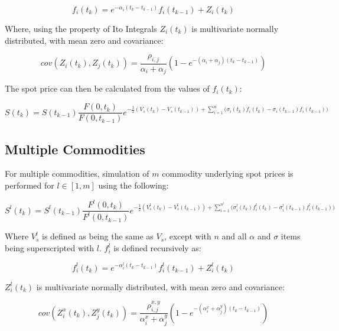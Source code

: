 \documentclass{article}
\begin{document}
\begin{equation}
    f_i(t_k) = e^{-\alpha_i(t_k - t_{k-1})}f_i(t_{k-1}) + Z_i(t_k)
\end{equation}

Where, using the property of Ito Integrals $Z_i(t_k)$ is multivariate normally 
distributed, with mean zero and covariance:

\begin{equation}
    cov(Z_i(t_k), Z_j(t_k)) = \frac{\rho_{i, j}}{\alpha_i + \alpha_j}(1 - 
    e^{-(\alpha_i + \alpha_j)(t_k - t_{k-1})})
\end{equation}

The spot price can then be calculated from the values of $f_i(t_k)$:

\begin{equation}
    S(t_k) = S(t_{k-1}) \frac{F(0, t_k)}{F(0, t_{k-1})} e^{- \frac{1}{2} (V_s(t_k) - 
    V_s(t_{k-1})) + \sum_{i=1}^n \bigl(\sigma_i(t_k)f_i(t_k) - \sigma_i(t_{k-1})f_i(t_{k-1})\bigr)}
\end{equation}

\subsection{Multiple Commodities}
For multiple commodities, simulation of $m$ commodity underlying spot prices is 
performed for $l \in [1, m]$ using the following:

\begin{equation}
    S^l(t_k) = S^l(t_{k-1}) \frac{F^l(0, t_k)}{F^l(0, t_{k-1})} e^{- \frac{1}{2} (V_s^l(t_k) - 
    V_s^l(t_{k-1})) + \sum_{i=1}^{n^l} \bigl(\sigma_i^l(t_k)f_i^l(t_k) - \sigma_i^l(t_{k-1})f_i^l(t_{k-1})\bigr)}
\end{equation}

Where $V_s^l$ is defined as being the same as $V_s$, except with $n$ and all $\alpha$ and 
$\sigma$ items being superscripted with $l$. $f_i^l$ is defined recursively as:

\begin{equation}
    f_i^l(t_k) = e^{-\alpha_i^l(t_k - t_{k-1})}f_i^l(t_{k-1}) + Z_i^l(t_k)
\end{equation}

$Z_i^l(t_k)$ is multivariate normally distributed, with mean zero and covariance:

\begin{equation}
    cov(Z_i^x(t_k), Z_j^y(t_k)) = \frac{\rho_{i, j}^{x, y}}{\alpha_i^x + \alpha_j^y}(1 - 
    e^{-(\alpha_i^x + \alpha_j^y)(t_k - t_{k-1})})
\end{equation}




\end{document}

